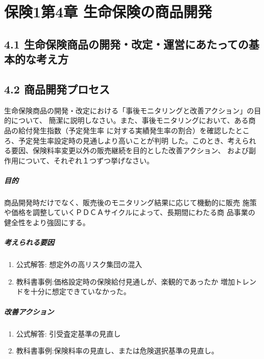 \documentclass[report,gutter=10mm,fore-edge=10mm,uplatex,dvipdfmx]{jlreq}
\begin{document}
\chapter{保険1第4章 生命保険の商品開発}
\section{4.1 生命保険商品の開発・改定・運営にあたっての基本的な考え方}
\section{4.2 商品開発プロセス}
生命保険商品の開発・改定における「事後モニタリングと改善アクション」の目的について、
簡潔に説明しなさい。また、事後モニタリングにおいて、ある商品の給付発生指数（予定発生率
に対する実績発生率の割合）を確認したところ、予定発生率設定時の見通しより高いことが判明
した。このとき、考えられる要因、保険料率変更以外の販売継続を目的とした改善アクション、
および副作用について、それぞれ１つずつ挙げなさい。

\paragraph{目的}
商品開発時だけでなく、販売後のモニタリング結果に応じて機動的に販売
施策や価格を調整していくＰＤＣＡサイクルによって、長期間にわたる商
品事業の健全性をより強固にする。\\

\paragraph{考えられる要因}
\begin{enumerate}
 \item 公式解答: 想定外の高リスク集団の混入 
 \item 教科書事例:価格設定時の保険給付見通しが、楽観的であったか
増加トレンドを十分に想定できていなかった。
\end{enumerate}

\paragraph{改善アクション}
\begin{enumerate}
 \item 公式解答: 引受査定基準の見直し
 \item 教科書事例:保険料率の見直し、または危険選択基準の見直し。
\end{enumerate}
\end{document}
